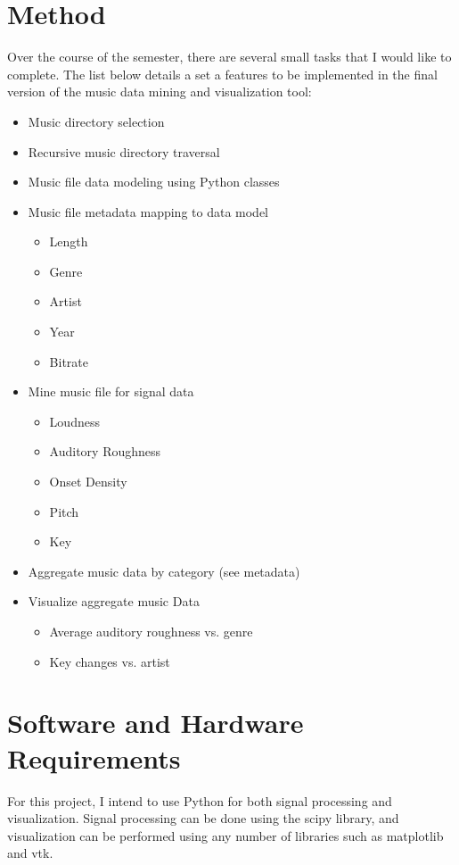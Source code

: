 \documentclass[12pt, a4paper]{article}
\begin{document}
\section*{Method}

Over the course of the semester, there are several small tasks that I would like
to complete. The list below details a set a features to be implemented in the
final version of the music data mining and visualization tool:

\begin{itemize}
  \item Music directory selection
  \item Recursive music directory traversal
  \item Music file data modeling using Python classes
  \item Music file metadata mapping to data model
  \begin{itemize}
    \item Length
    \item Genre
    \item Artist
    \item Year
    \item Bitrate
  \end{itemize}
  \item Mine music file for signal data
  \begin{itemize}
    \item Loudness
    \item Auditory Roughness
    \item Onset Density
    \item Pitch
    \item Key
  \end{itemize}
  \item Aggregate music data by category (see metadata)
  \item Visualize aggregate music Data
  \begin{itemize}
    \item Average auditory roughness vs. genre
    \item Key changes vs. artist
  \end{itemize}
\end{itemize}

\section*{Software and Hardware Requirements}

For this project, I intend to use Python for both signal processing and
visualization. Signal processing can be done using the scipy library, and
visualization can be performed using any number of libraries such as
matplotlib and vtk.
\end{document}
